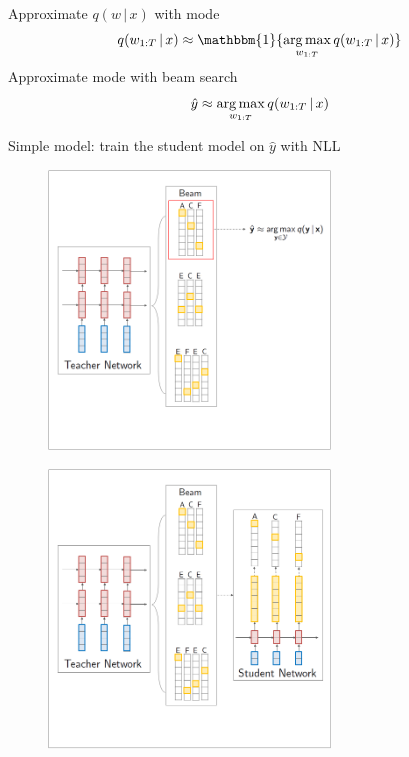 \documentclass{beamer}
\newcommand{\air}{\vspace{0.25cm}}
\newcommand{\given}{\,|\,}
\def\argmax{\operatornamewithlimits{arg\,max}}
\def\argmax{\operatornamewithlimits{arg\,max}}
\begin{document}
\begin{frame}
\centerline{}
\air 
\air
Approximate $q(w \given x )$ with mode
$$q(w_{1:T} \given x) \approx \mathbbm{1}\{\argmax_{w_{1:T}} q(w_{1:T} \given x )\}$$
\air
\pause
Approximate mode with  beam search 
$$ \hat{y} \approx  \argmax_{w_{1:T}} q(w_{1:T} \given x) $$
\pause

Simple model: train the student model on $\hat{y}$ with NLL
\end{frame}


\begin{frame}
\centerline{}
\air 
\air
\begin{figure}
\center
\includegraphics[width=7.5cm]{seq-kd-1}
\end{figure}
\end{frame}

\begin{frame}
\centerline{}
\air
\air  
\begin{figure}
\center
\includegraphics[width=7.5cm]{seq-kd-2}
\end{figure}
\end{frame}
\end{document}
